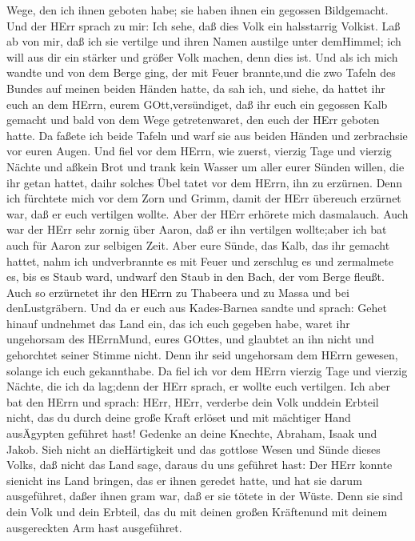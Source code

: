 Wege, den ich ihnen geboten habe; sie haben ihnen ein gegossen
Bildgemacht.  Und der HErr sprach zu mir: Ich sehe, daß
dies Volk ein halsstarrig Volkist.  Laß ab von mir, daß ich
sie vertilge und ihren Namen austilge unter demHimmel; ich will aus dir
ein stärker und größer Volk machen, denn dies ist.  Und als
ich mich wandte und von dem Berge ging, der mit Feuer brannte,und die
zwo Tafeln des Bundes auf meinen beiden Händen hatte,  da
sah ich, und siehe, da hattet ihr euch an dem HErrn, eurem
GOtt,versündiget, daß ihr euch ein gegossen Kalb gemacht und bald von
dem Wege getretenwaret, den euch der HErr geboten hatte. 
Da faßete ich beide Tafeln und warf sie aus beiden Händen und
zerbrachsie vor euren Augen.  Und fiel vor dem HErrn, wie
zuerst, vierzig Tage und vierzig Nächte und aßkein Brot und trank kein
Wasser um aller eurer Sünden willen, die ihr getan hattet, daihr solches
Übel tatet vor dem HErrn, ihn zu erzürnen.  Denn ich
fürchtete mich vor dem Zorn und Grimm, damit der HErr übereuch erzürnet
war, daß er euch vertilgen wollte. Aber der HErr erhörete mich
dasmalauch.  Auch war der HErr sehr zornig über Aaron, daß
er ihn vertilgen wollte;aber ich bat auch für Aaron zur selbigen Zeit.
 Aber eure Sünde, das Kalb, das ihr gemacht hattet, nahm
ich undverbrannte es mit Feuer und zerschlug es und zermalmete es, bis
es Staub ward, undwarf den Staub in den Bach, der vom Berge fleußt.
 Auch so erzürnetet ihr den HErrn zu Thabeera und zu Massa
und bei denLustgräbern.  Und da er euch aus Kades-Barnea
sandte und sprach: Gehet hinauf undnehmet das Land ein, das ich euch
gegeben habe, waret ihr ungehorsam des HErrnMund, eures GOttes, und
glaubtet an ihn nicht und gehorchtet seiner Stimme nicht. 
Denn ihr seid ungehorsam dem HErrn gewesen, solange ich euch
gekannthabe.  Da fiel ich vor dem HErrn vierzig Tage und
vierzig Nächte, die ich da lag;denn der HErr sprach, er wollte euch
vertilgen.  Ich aber bat den HErrn und sprach: HErr, HErr,
verderbe dein Volk unddein Erbteil nicht, das du durch deine große Kraft
erlöset und mit mächtiger Hand ausÄgypten geführet hast! 
Gedenke an deine Knechte, Abraham, Isaak und Jakob. Sieh nicht an
dieHärtigkeit und das gottlose Wesen und Sünde dieses Volks,
 daß nicht das Land sage, daraus du uns geführet hast: Der
HErr konnte sienicht ins Land bringen, das er ihnen geredet hatte, und
hat sie darum ausgeführet, daßer ihnen gram war, daß er sie tötete in
der Wüste.  Denn sie sind dein Volk und dein Erbteil, das
du mit deinen großen Kräftenund mit deinem ausgereckten Arm hast
ausgeführet.

